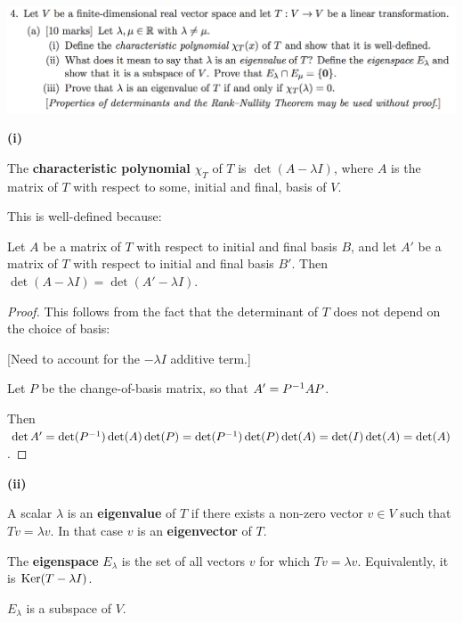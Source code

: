 \documentclass[12pt]{article}
\begin{document}
\newpage
\begin{mdframed}
\includegraphics[width=400pt]{img/oxford-prelims-2017-A-4-1.png}
\end{mdframed}
\textbf{(i)}
\begin{definition*}
  The \textbf{characteristic polynomial} $\chi_T$ of $T$ is
  $\det(A - \lambda I)$, where $A$ is the matrix of $T$ with respect to some,
  initial and final, basis of $V$.
\end{definition*}

This is well-defined because:

\begin{claim*}
  Let $A$ be a matrix of $T$ with respect to initial and final basis $B$, and
  let $A'$ be a matrix of $T$ with respect to initial and final basis
  $B'$. Then $\det(A - \lambda I) = \det(A' - \lambda I)$.
\end{claim*}

\begin{proof}
  This follows from the fact that the determinant of $T$ does not depend on the
  choice of basis:

  [Need to account for the $-\lambda I$ additive term.]

  Let $P$ be the change-of-basis matrix, so that $A' = P^{-1}AP$.

  Then $\det A' = \det(P^{-1})\det(A)\det(P) = \det(P^{-1})\det(P)\det(A) = \det(I)\det(A) = \det(A)$.
\end{proof}

\textbf{(ii)}
\begin{definition*}
  A scalar $\lambda$ is an \textbf{eigenvalue} of $T$ if there exists a
  non-zero vector $v \in V$ such that $Tv = \lambda v$. In that case $v$ is an
  \textbf{eigenvector} of $T$.
\end{definition*}

\begin{definition*}
  The \textbf{eigenspace} $E_\lambda$ is the set of all vectors $v$ for which
  $Tv = \lambda v$. Equivalently, it is $\operatorname{\mathrm{Ker}}(T - \lambda I)$.
\end{definition*}

\begin{claim*}
  $E_\lambda$ is a subspace of $V$.
\end{claim*}
\end{document}
